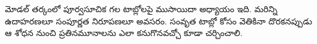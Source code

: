 \documentclass[../../../include/open-logic-chapter]{subfiles}
\begin{document}

\begin{editorial}
  మోడల్ తర్కంలో పూర్వసూచిక గల టాబ్లోలపై
  ముసాయిదా అధ్యాయం ఇది. మరిన్ని ఉదాహరణలూ సంపూర్ణత
  నిరూపణలూ అవసరం. సంవృత టాబ్లో కోసం వెతికినా దొరకనప్పుడు
  ఆ శోధన నుంచి ప్రతినమూనాలను ఎలా కనుగొనవచ్చో కూడా
  చర్చించాలి.
\end{editorial}


\OLEndChapterHook
\end{document}
